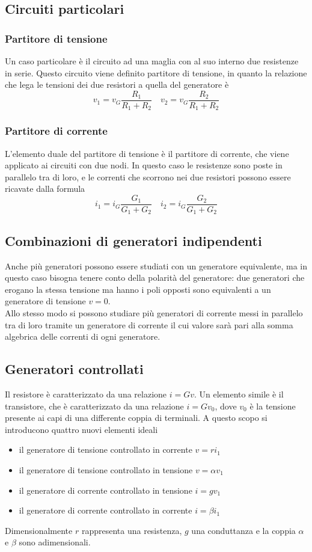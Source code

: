 \documentclass[a4paper,12pt]{article}
\begin{document}
\subsection{Circuiti particolari}
\subsubsection{Partitore di tensione}
Un caso particolare è il circuito ad una maglia con al suo interno due resistenze in serie. Questo circuito viene definito partitore di tensione, in quanto la relazione che lega le tensioni dei due resistori a quella del generatore è 
$$v_1 = v_G\frac{R_1}{R_1 + R_2} \quad v_2 = v_G\frac{R_2}{R_1 + R_2}$$
\subsubsection{Partitore di corrente}
L'elemento duale del partitore di tensione è il partitore di corrente, che viene applicato ai circuiti con due nodi. In questo caso le resistenze sono poste in parallelo tra di loro, e le correnti che scorrono nei due resistori possono essere ricavate dalla formula 
$$i_1 = i_G \frac{G_1}{G_1 + G_2} \quad i_2 = i_G \frac{G_2}{G_1 + G_2}$$
\subsection{Combinazioni di generatori indipendenti}
Anche più generatori possono essere studiati con un generatore equivalente, ma in questo caso bisogna tenere conto della polarità del generatore: due generatori che erogano la stessa tensione ma hanno i poli opposti sono equivalenti a un generatore di tensione $v = 0$. \\
Allo stesso modo si possono studiare più generatori di corrente messi in parallelo tra di loro tramite un generatore di corrente il cui valore sarà pari alla somma algebrica delle correnti di ogni generatore.
\subsection{Generatori controllati}
Il resistore è caratterizzato da una relazione $i = Gv$. Un elemento simile è il transistore, che è caratterizzato da una relazione $ i = Gv_0$, dove $v_0$ è la tensione presente ai capi di una differente coppia di terminali. A questo scopo si introducono quattro nuovi elementi ideali
\begin{itemize}
\item il generatore di tensione controllato in corrente $v = ri_1$
\item il generatore di tensione controllato in tensione $v = \alpha v_1$
\item il generatore di corrente controllato in tensione $i = gv_1$
\item il generatore di corrente controllato in corrente $i = \beta i_1$
\end{itemize}
Dimensionalmente $r$ rappresenta una resistenza, $g$ una conduttanza e la coppia $\alpha$ e $\beta$ sono adimensionali.
\end{document}
